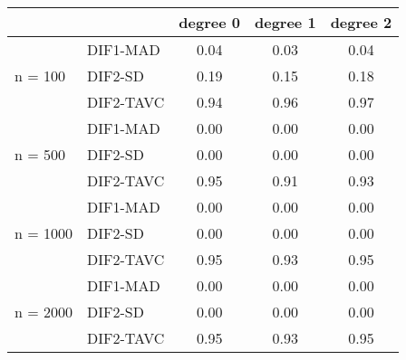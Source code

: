 \begin{tabular}{|l|l|c|c|c|}
  \hline
 &  & degree 0 & degree 1 & degree 2 \\ 
  \hline
 & DIF1-MAD & 0.04 & 0.03 & 0.04 \\ 
  n = 100 & DIF2-SD & 0.19 & 0.15 & 0.18 \\ 
   & DIF2-TAVC & 0.94 & 0.96 & 0.97 \\ 
   & DIF1-MAD & 0.00 & 0.00 & 0.00 \\ 
  n = 500 & DIF2-SD & 0.00 & 0.00 & 0.00 \\ 
   & DIF2-TAVC & 0.95 & 0.91 & 0.93 \\ 
   & DIF1-MAD & 0.00 & 0.00 & 0.00 \\ 
  n = 1000 & DIF2-SD & 0.00 & 0.00 & 0.00 \\ 
   & DIF2-TAVC & 0.95 & 0.93 & 0.95 \\ 
   & DIF1-MAD & 0.00 & 0.00 & 0.00 \\ 
  n = 2000 & DIF2-SD & 0.00 & 0.00 & 0.00 \\ 
   & DIF2-TAVC & 0.95 & 0.93 & 0.95 \\ 
   \hline
\end{tabular}
